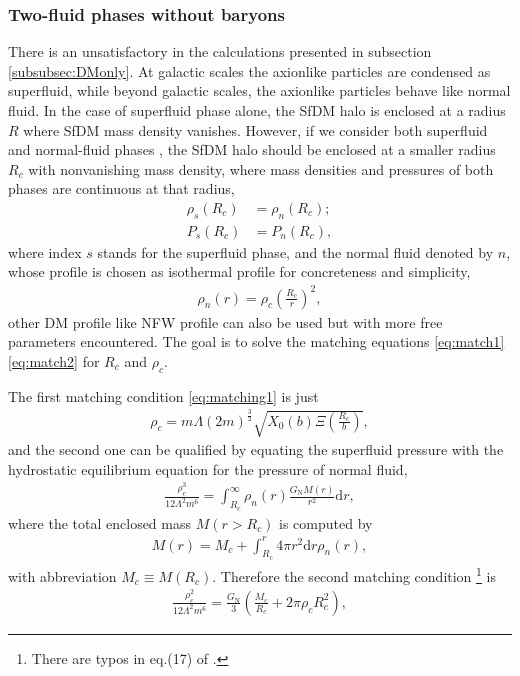 \documentclass[aps,prd,twocolumn,10pt,groupedaddress]{revtex4-1}
\begin{document}
\subsubsection{Two-fluid phases without baryons} \label{subsubsec:twofluid}

There is an unsatisfactory in the calculations presented in subsection \ref{subsubsec:DMonly}. At galactic scales the axionlike particles are condensed as superfluid, while beyond galactic scales, the axionlike particles behave like normal fluid. In the case of superfluid phase alone, the SfDM halo is enclosed at a radius $R$ where SfDM mass density vanishes. However, if we consider both superfluid and normal-fluid phases \cite{Hodson:2016rck}, the SfDM halo should be enclosed at a smaller radius $R_c$ with nonvanishing mass density, where mass densities and pressures of both phases are continuous at that radius,
\begin{align}
\rho_s(R_c)&=\rho_n(R_c);\label{eq:matching1}\\
P_s(R_c)&=P_n(R_c),\label{eq:matching2}
\end{align}
where index $s$ stands for the superfluid phase, and the normal fluid denoted by $n$, whose profile is chosen as isothermal profile for concreteness and simplicity,
\begin{align}
\rho_n(r)=\rho_c\left(\frac{R_c}{r}\right)^2,
\end{align}
other DM profile like NFW profile can also be used but with more free parameters encountered. The goal is to solve the matching equations \eqref{eq:match1} \eqref{eq:match2} for $R_c$ and $\rho_c$.

The first matching condition \eqref{eq:matching1} is just
\begin{align}\label{eq:match1}
\rho_c=m\Lambda(2m)^\frac32\sqrt{X_0(b)\Xi\left(\frac{R_c}{b}\right)},
\end{align}
and the second one can be qualified by equating the superfluid pressure with the hydrostatic equilibrium equation for the pressure of normal fluid,
\begin{align}
\frac{\rho_c^3}{12\Lambda^2m^6}=\int_{R_c}^\infty\rho_n(r)\frac{G_\mathrm{N}M(r)}{r^2}\mathrm{d}r,
\end{align}
where the total enclosed mass $M(r>R_c)$ is computed by
\begin{align}
M(r)=M_c+\int_{R_c}^r4\pi r^2\mathrm{d}r \rho_n(r),
\end{align}
with abbreviation $M_c\equiv M(R_c)$. Therefore the second matching condition \footnote{There are typos in eq.(17) of \cite{Hodson:2016rck}.} is
\begin{align}\label{eq:match2}
\frac{\rho_c^2}{12\Lambda^2m^6}=\frac{G_\mathrm{N}}{3}\left(\frac{M_c}{R_c}+2\pi\rho_cR_c^2\right),
\end{align}
\end{document}
